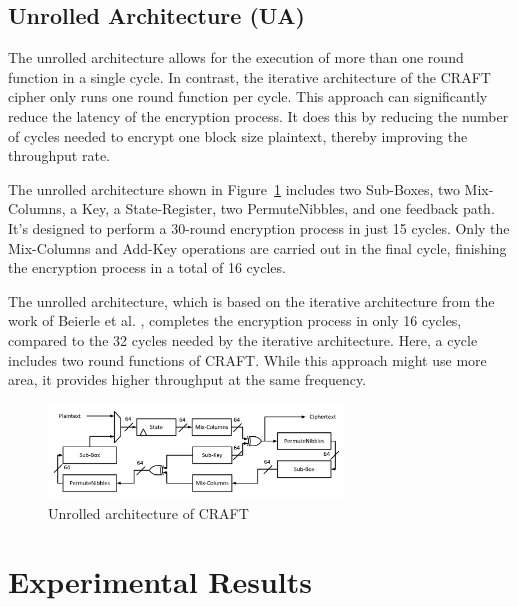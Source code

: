 \documentclass[final,5p,times,twocolumn]{elsarticle}
\begin{document}
\subsection{Unrolled Architecture (UA)}\label{subsec3}

The unrolled architecture allows for the execution of more than one round function in a single cycle. In contrast, the iterative architecture of the CRAFT cipher only runs one round function per cycle. This approach can significantly reduce the latency of the encryption process. It does this by reducing the number of cycles needed to encrypt one block size plaintext, thereby improving the throughput rate.

The unrolled architecture shown in Figure~\ref{fig4} includes two Sub-Boxes, two Mix-Columns, a Key, a State-Register, two PermuteNibbles, and one feedback path. It's designed to perform a 30-round encryption process in just 15 cycles. Only the Mix-Columns and Add-Key operations are carried out in the final cycle, finishing the encryption process in a total of 16 cycles.

The unrolled architecture, which is based on the iterative architecture from the work of Beierle et al. \cite{Beierle2019}, completes the encryption process in only 16 cycles, compared to the 32 cycles needed by the iterative architecture. Here, a cycle includes two round functions of CRAFT. While this approach might use more area, it provides higher throughput at the same frequency.


\begin{figure}[h]%
    \centering
    \includegraphics[width=0.7\textwidth]{./fig/unrolled-archticture.pdf}
    \caption{Unrolled architecture of CRAFT}\label{fig4}
\end{figure}






\section{Experimental Results}\label{sec4}
\end{document}
